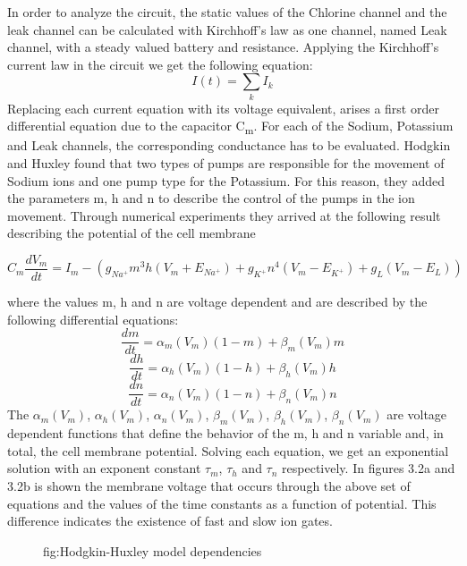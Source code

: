 \documentclass[12pt]{report}
\begin{document}
In order to analyze the circuit, the static values of the Chlorine channel and the leak channel can be calculated with Kirchhoff's law as one channel, named Leak channel, with a steady valued battery and resistance. Applying the Kirchhoff's current law in the circuit we get the following equation: \[I(t) = \sum_{k}I_k\]
Replacing each current equation with its voltage equivalent, arises a first order differential equation due to the capacitor C\textsubscript{m}. For each of the Sodium, Potassium and Leak channels, the corresponding conductance has to be evaluated. Hodgkin and Huxley found that two types of pumps are responsible for the movement of Sodium ions and one pump type for the Potassium. For this reason, they added the parameters m, h and n to describe the control of the pumps in the ion movement. Through numerical experiments they arrived at the following result describing the potential of the cell membrane

\begin{equation}
C_m\frac{dV_m}{dt} = I_m - (g_{Na^+}m^3h(V_m+E_{Na^+}) + g_{K^+}n^4(V_m-E_{K^+}) + g_L(V_m-E_L))
\end{equation}


where the values m, h and n are voltage dependent and are described by the following differential equations:
\begin{equation}
\frac{dm}{dt}=\alpha_m(V_m)(1-m)+\beta_m(V_m)m
\end{equation}
\begin{equation}
\frac{dh}{dt}=\alpha_h(V_m)(1-h)+\beta_h(V_m)h
\end{equation}
\begin{equation}
\frac{dn}{dt}=\alpha_n(V_m)(1-n)+\beta_n(V_m)n
\end{equation}
The \(\alpha_m(V_m)\), \(\alpha_h(V_m)\), \(\alpha_n(V_m)\), \(\beta_m(V_m)\), \(\beta_h(V_m)\), \(\beta_n(V_m)\) are voltage dependent functions that define the behavior of the m, h and n variable and, in total, the cell membrane potential. Solving each equation, we get an exponential solution with an exponent constant \(\tau_m\), \(\tau_h\) and \(\tau_n\) respectively. In figures 3.2a and 3.2b is shown the membrane voltage that occurs through the above set of equations and the values of the time constants as a function of potential. This difference indicates the existence of fast and slow ion gates.

\begin{figure}[htp]
    \centering
    \hfill
    \caption{fig:Hodgkin-Huxley model dependencies}
\end{figure}
\end{document}

